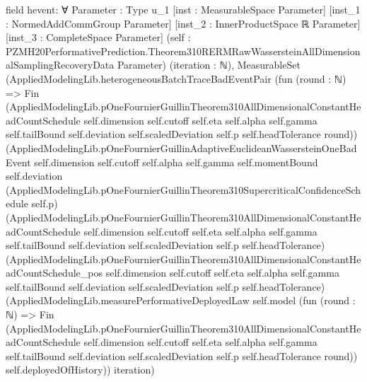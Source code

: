 \documentclass[10pt]{article}
\begin{document}
\begin{ReviewVerbatim}
field hevent:
∀ {Parameter : Type u_1} [inst : MeasurableSpace Parameter] [inst_1 : NormedAddCommGroup Parameter]
  [inst_2 : InnerProductSpace ℝ Parameter] [inst_3 : CompleteSpace Parameter]
  (self : PZMH20PerformativePrediction.Theorem310RERMRawWassersteinAllDimensionalSamplingRecoveryData Parameter)
  (iteration : ℕ),
  MeasurableSet
    (AppliedModelingLib.heterogeneousBatchTraceBadEventPair
      (fun (round : ℕ) =>
        Fin
          (AppliedModelingLib.pOneFournierGuillinTheorem310AllDimensionalConstantHeadCountSchedule self.dimension
            self.cutoff self.eta self.alpha self.gamma self.tailBound self.deviation self.scaledDeviation self.p
            self.headTolerance round))
      (AppliedModelingLib.pOneFournierGuillinAdaptiveEuclideanWassersteinOneBadEvent self.dimension self.cutoff
        self.alpha self.gamma self.momentBound self.deviation
        (AppliedModelingLib.pOneFournierGuillinTheorem310SupercriticalConfidenceSchedule self.p)
        (AppliedModelingLib.pOneFournierGuillinTheorem310AllDimensionalConstantHeadCountSchedule self.dimension
          self.cutoff self.eta self.alpha self.gamma self.tailBound self.deviation self.scaledDeviation self.p
          self.headTolerance)
        (AppliedModelingLib.pOneFournierGuillinTheorem310AllDimensionalConstantHeadCountSchedule_pos self.dimension
          self.cutoff self.eta self.alpha self.gamma self.tailBound self.deviation self.scaledDeviation self.p
          self.headTolerance)
        (AppliedModelingLib.measurePerformativeDeployedLaw self.model
          (fun (round : ℕ) =>
            Fin
              (AppliedModelingLib.pOneFournierGuillinTheorem310AllDimensionalConstantHeadCountSchedule self.dimension
                self.cutoff self.eta self.alpha self.gamma self.tailBound self.deviation self.scaledDeviation self.p
                self.headTolerance round))
          self.deployedOfHistory))
      iteration)
\end{ReviewVerbatim}
\end{document}
